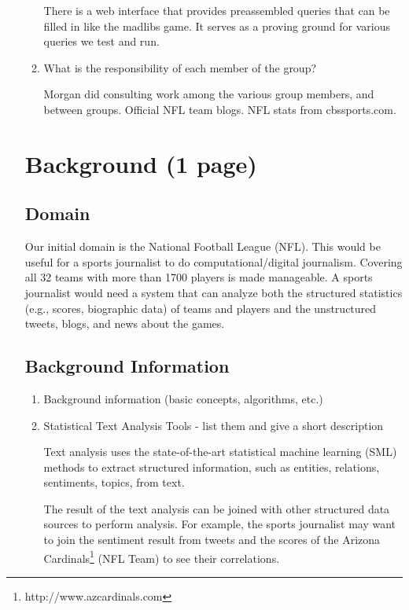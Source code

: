 \documentclass{article}
\begin{document}
\begin{enumerate}
\begin{enumerate}
    There is a web interface that provides preassembled queries that can be filled in like the madlibs game.
    It serves as a proving ground for various queries we test and run.

  \item What is the responsibility of each member of the group?



    Morgan did consulting work among the various group members, and between groups.
    Official NFL team blogs. NFL stats from cbssports.com.
  \end{enumerate}

  \section{Background (1 page)}
  \subsection{Domain}

  Our initial domain is the National Football League (NFL).
  This would be useful for a sports journalist to do computational/digital journalism.
  Covering all 32 teams with more than 1700 players is made manageable.
  A sports journalist would need a system
  that can analyze both the
  structured statistics (e.g., scores, biographic data) of teams and players and the
  unstructured tweets, blogs, and news about the games.



  \subsection{Background Information}
  \begin{enumerate}
  \item Background information (basic concepts, algorithms, etc.)



  \item Statistical Text Analysis Tools - list them and give a short description

    Text analysis uses the state-of-the-art statistical machine learning (SML) methods to extract structured information,
    such as entities, relations, sentiments, topics, from text.

    The result of the text analysis can be joined with other
    structured data sources to perform analysis. For example, the sports
    journalist may want to join the sentiment result from tweets and the
    scores of the Arizona Cardinals\footnote{http://www.azcardinals.com}
    (NFL Team) to see their correlations.



\end{enumerate}
\end{enumerate}
\end{document}
